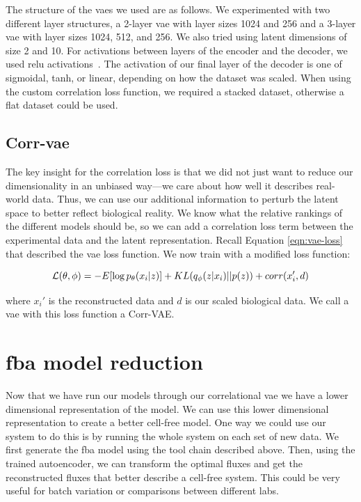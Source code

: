 The structure of the \glspl{vae} we used are as follows.
We experimented with two different layer structures, a 2-layer \gls{vae} with layer sizes 1024 and 256 and a 3-layer \gls{vae} with layer sizes 1024, 512, and 256.
We also tried using latent dimensions of size 2 and 10.
For activations between layers of the encoder and the decoder, we used \gls{relu} activations~\cite{nair2010rectified}.
The activation of our final layer of the decoder is one of sigmoidal, tanh, or linear, depending on how the dataset was scaled.
When using the custom correlation loss function, we required a stacked dataset, otherwise a flat dataset could be used.

\subsection{Corr-\gls{vae}}
The key insight for the correlation loss is that we did not just want to reduce our dimensionality in an unbiased way---we care about how well it describes real-world data.
Thus, we can use our additional information to perturb the latent space to better reflect biological reality.
We know what the relative rankings of the different models should be, so we can add a correlation loss term between the experimental data and the latent representation.
Recall Equation \ref{eqn:vae-loss} that described the \gls{vae} loss function.
We now train with a modified loss function:


\begin{equation}\label{eqn:corr-loss}
\mathcal{L}(\theta, \phi) = - E[\log p_{\theta}(x_i | z)] + KL(q_{\phi}(z | x_i) || p(z)) + corr(x_i', d)\\
\end{equation}

where $x_i'$ is the reconstructed data and $d$ is our scaled biological data.
We call a \gls{vae} with this loss function a Corr-VAE.

\section{\gls{fba} model reduction}
Now that we have run our models through our correlational \gls{vae} we have a lower dimensional representation of the model.
We can use this lower dimensional representation to create a better cell-free model.
One way we could use our system to do this is by running the whole system on each set of new data.
We first generate the \gls{fba} model using the tool chain described above.
Then, using the trained autoencoder, we can transform the optimal fluxes and get the reconstructed fluxes that better describe a cell-free system.
This could be very useful for batch variation or comparisons between different labs.

